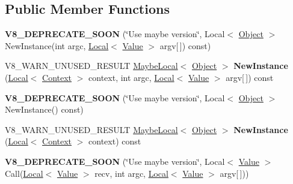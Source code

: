 \subsection*{Public Member Functions}
\begin{DoxyCompactItemize}
\item 
\hypertarget{classv8_1_1Function_a29ed78fd6c4025963234be2dfeb1d193}{}{\bfseries V8\+\_\+\+D\+E\+P\+R\+E\+C\+A\+T\+E\+\_\+\+S\+O\+O\+N} (\char`\"{}Use maybe version\char`\"{}, Local$<$ \hyperlink{classv8_1_1Object}{Object} $>$ New\+Instance(int argc, \hyperlink{classv8_1_1Local}{Local}$<$ \hyperlink{classv8_1_1Value}{Value} $>$ argv\mbox{[}$\,$\mbox{]}) const)\label{classv8_1_1Function_a29ed78fd6c4025963234be2dfeb1d193}

\item 
\hypertarget{classv8_1_1Function_af0c5c1673f2a0b042dbfc1c25f2c19fe}{}V8\+\_\+\+W\+A\+R\+N\+\_\+\+U\+N\+U\+S\+E\+D\+\_\+\+R\+E\+S\+U\+L\+T \hyperlink{classv8_1_1MaybeLocal}{Maybe\+Local}$<$ \hyperlink{classv8_1_1Object}{Object} $>$ {\bfseries New\+Instance} (\hyperlink{classv8_1_1Local}{Local}$<$ \hyperlink{classv8_1_1Context}{Context} $>$ context, int argc, \hyperlink{classv8_1_1Local}{Local}$<$ \hyperlink{classv8_1_1Value}{Value} $>$ argv\mbox{[}$\,$\mbox{]}) const \label{classv8_1_1Function_af0c5c1673f2a0b042dbfc1c25f2c19fe}

\item 
\hypertarget{classv8_1_1Function_a8fe4c173680920e0389fbe8244eea425}{}{\bfseries V8\+\_\+\+D\+E\+P\+R\+E\+C\+A\+T\+E\+\_\+\+S\+O\+O\+N} (\char`\"{}Use maybe version\char`\"{}, Local$<$ \hyperlink{classv8_1_1Object}{Object} $>$ New\+Instance() const)\label{classv8_1_1Function_a8fe4c173680920e0389fbe8244eea425}

\item 
\hypertarget{classv8_1_1Function_aae5c830b715559ab0d2e941ad8181cb2}{}V8\+\_\+\+W\+A\+R\+N\+\_\+\+U\+N\+U\+S\+E\+D\+\_\+\+R\+E\+S\+U\+L\+T \hyperlink{classv8_1_1MaybeLocal}{Maybe\+Local}$<$ \hyperlink{classv8_1_1Object}{Object} $>$ {\bfseries New\+Instance} (\hyperlink{classv8_1_1Local}{Local}$<$ \hyperlink{classv8_1_1Context}{Context} $>$ context) const \label{classv8_1_1Function_aae5c830b715559ab0d2e941ad8181cb2}

\item 
\hypertarget{classv8_1_1Function_a013663cd170e5b27ec9e2b54e72f3e3d}{}{\bfseries V8\+\_\+\+D\+E\+P\+R\+E\+C\+A\+T\+E\+\_\+\+S\+O\+O\+N} (\char`\"{}Use maybe version\char`\"{}, Local$<$ \hyperlink{classv8_1_1Value}{Value} $>$ Call(\hyperlink{classv8_1_1Local}{Local}$<$ \hyperlink{classv8_1_1Value}{Value} $>$ recv, int argc, \hyperlink{classv8_1_1Local}{Local}$<$ \hyperlink{classv8_1_1Value}{Value} $>$ argv\mbox{[}$\,$\mbox{]}))\label{classv8_1_1Function_a013663cd170e5b27ec9e2b54e72f3e3d}


\end{DoxyCompactItemize}
